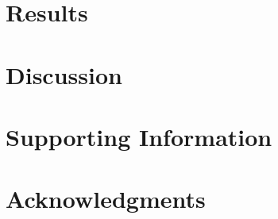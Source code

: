 \documentclass[10pt,letterpaper]{article}
\begin{document}
\section*{Results}



\section*{Discussion}


\section*{Supporting Information}



\section*{Acknowledgments}

\nolinenumbers
\end{document}
